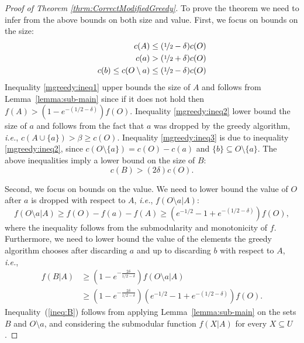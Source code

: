 \documentclass[a4paper,UKenglish,cleveref, autoref]{lipics-v2019}
\begin{document}
\begin{proof}[Proof of Theorem \ref{thrm:CorrectModifiedGreedy}]
	To prove the theorem we need to infer from the above bounds on both size and value.
	First, we focus on bounds on the size:
	\begin{align}
		\label{mgreedy:ineq1}
		c(A) \leq (\nicefrac[]{1}{2} - \delta)c(O)
		\\
		\label{mgreedy:ineq2}
		c(a) > (\nicefrac[]{1}{2} + \delta)c(O)
		\\
		\label{mgreedy:ineq3}
		c(b) \leq c(O \setminus a) \leq (\nicefrac[]{1}{2} - \delta)c(O)
	\end{align}
	Inequality \eqref{mgreedy:ineq1} upper bounds the size of $A$ and follows from  Lemma~\ref{lemma:sub-main} since if it does not hold then $f(A) > (1 - e^{-(1/2 - \delta)})f(O)$.
	Inequality \eqref{mgreedy:ineq2} lower bound the size of $a$ and follows from the fact that $a$ was dropped by the greedy algorithm, {\em i.e.}, $c(A \cup \{a\}) > \beta \geq c(O)$. Inequality \eqref{mgreedy:ineq3} is due to inequality \eqref{mgreedy:ineq2}, since $c(O \setminus \{a\}) = c(O) - c(a)$ and $\{b\} \subseteq O \setminus \{a\}$.
	The above inequalities imply a lower bound  on the size of $B$:
	\begin{equation}
		\label{mgreedy:ineq4}
		c(B) > (2\delta)c(O).
	\end{equation}

	Second, we focus on bounds on the value.
	We need to lower bound the value of $O$ after $a$ is dropped with respect to $A$, {\em i.e.}, $f(O \setminus a | A)$:
	\begin{equation}
		f(O \setminus a | A) \geq f(O) - f(a) - f(A) \geq (e^{-1/2} - 1 + e^{-(1/2 - \delta)})f(O),
	\end{equation}
	where the inequality follows from the submodularity and monotonicity of $f$.
	Furthermore, we need to lower bound the value of the elements the greedy algorithm chooses after discarding $a$ and up to discarding $b$ with respect to $A$, {\em i.e.},	
	\begin{align}
		\label{ineq:B}
		f(B|A)	& \geq (1 - e^{-\frac{2\delta}{1/2 - \delta}})f(O \setminus a | A)
		\\ 		& \geq (1 - e^{-\frac{2\delta}{1/2 - \delta}})(e^{-1/2} - 1 + e^{-(1/2 - \delta)})f(O).
		\nonumber
	\end{align}	
	Inequality~(\ref{ineq:B}) follows from applying Lemma~\ref{lemma:sub-main} on the sets $B$ and $O \setminus a$, and considering the submodular function $f(X|A)$ for every $X \subseteq U$.
	

\end{proof}
\end{document}
